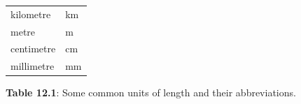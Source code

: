 {{\begin{center}
\begin{xtabular}[t]{|l|l|}
        kilometre &
        km%
     \tabularnewline{}
        metre &
        m%
     \tabularnewline{}
        centimetre &
        cm%
     \tabularnewline{}
        millimetre &
        mm%
     \tabularnewline{}
    \end{xtabular}
      \end{center}
    \begin{center}{\small\bfseries Table 12.1}: Some common units of length and their abbreviations.\end{center}
          } %
        }{%
}
